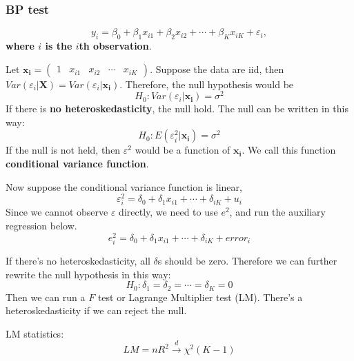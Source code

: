 \documentclass[12pt]{article}
\begin{document}
\subsubsection{BP test}
\begin{equation*}
y_{i} = \beta_0 + \beta_1x_{i 1} + \beta_2x_{i 2} + \cdots + \beta_{K}x_{i K} + \varepsilon_{i},
\end{equation*}
{\textbf {where $ i $ is the $ i $th observation}}.

Let $ \bm{x_{i}} = 
\begin{pmatrix}
1 &x_{i 1} &x_{i 2} &\cdots &x_{i K}
\end{pmatrix}
 $.
 Suppose the data are iid, then $ Var(\varepsilon_{i}|\bm{X}) = Var(\varepsilon_{i}
 | \bm{x_{i}})$.
 Therefore, the null hypothesis would be 
 \begin{equation*}
 H_0: Var(\varepsilon_{i}| \bm{x_{i}}) = \sigma^{2}
 \end{equation*}
 If there is {\textbf {no heteroskedasticity}}, the null hold.
 The null can be written in this way:
 \begin{equation*}
 H_0: E(\varepsilon_{i}^{2}| \bm{x_{i}}) = \sigma^{2}
 \end{equation*}
 If the null is not held, then $ \varepsilon^{2} $ would be a function of $ \bm{x_{i}} $.
 We call this function {\textbf {conditional variance function}}.

 Now suppose the conditional variance function is linear,
 \begin{equation*}
 \varepsilon_{i}^{2} = \delta_0 + \delta_1x_{i 1} + \cdots  + \delta_{i K} + u_{i}
 \end{equation*}
 Since we cannot observe $ \varepsilon $ directly, we need to use $ e^{2} $, and run
 the auxiliary regression below.
 \begin{equation*}
 e_{i}^{2} = \delta_0 + \delta_1x_{i 1} + \cdots  + \delta_{i K} +  error_{i}
 \end{equation*}

 If there's no heteroskedasticity, all $ \delta $s should be zero. Therefore we can 
 further rewrite the null hypothesis in this way:
 \begin{equation*}
 H_0: \delta_1 = \delta_2 = \cdots = \delta_{K} = 0
 \end{equation*}
 Then we can run a $ F $ test or Lagrange Multiplier test (LM). There's a 
 heteroskedasticity if we can reject the null.

 LM statistics:
 \begin{equation*}
 LM	 = nR^{2} \xrightarrow{d} \chi^{2}(K - 1)
 \end{equation*}
\end{document}
